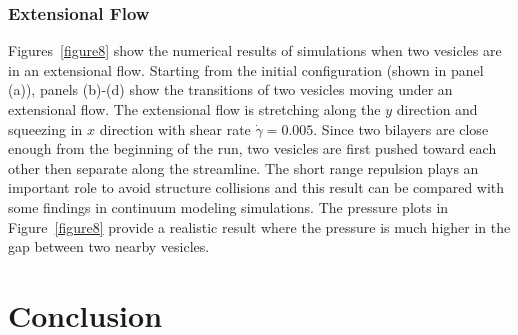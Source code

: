\documentclass[lineno]{jfm}
\begin{document}
\subsubsection{Extensional Flow}

Figures~\ref{figure8} show the numerical results of simulations when two vesicles are in an extensional flow. Starting from the initial configuration (shown in panel (a)), panels (b)-(d) show the transitions of two vesicles moving under an extensional flow. The extensional flow is stretching along the $y$ direction and squeezing in $x$ direction with shear rate $\dot\gamma=0.005$. Since two bilayers are close enough
from the beginning of the run, two vesicles are first pushed toward each other then separate along the streamline. The short range repulsion plays an important role to avoid structure collisions and 
this result can be compared with some findings in continuum modeling simulations.
The pressure plots in Figure~\ref{figure8} provide a realistic result where the pressure is much higher in the gap between two nearby vesicles.






\section{\label{conclusion}Conclusion}


\begin{acknowledgments}
\end{acknowledgments}

\appendix
\end{document}
